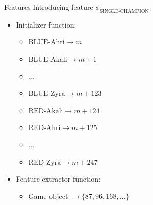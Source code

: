 \begin{frame}{Features}
Introducing feature $\phi_\text{SINGLE-CHAMPION}$
\begin{itemize}
\item Initializer function:
	\begin{itemize}
	\item $\text{BLUE-Ahri} \rightarrow m$
	\item $\text{BLUE-Akali} \rightarrow m+1$
	\item ...
	\item $\text{BLUE-Zyra} \rightarrow m+123$
	\item $\text{RED-Akali} \rightarrow m+124$
	\item $\text{RED-Ahri} \rightarrow m+125$
	\item ...
	\item $\text{RED-Zyra}\rightarrow m+247$
	\end{itemize}
\item Feature extractor function:  
	\begin{itemize}
	\item Game object $\rightarrow \{87, 96, 168, ...\}$
	\end{itemize}
\end{itemize}
\end{frame}